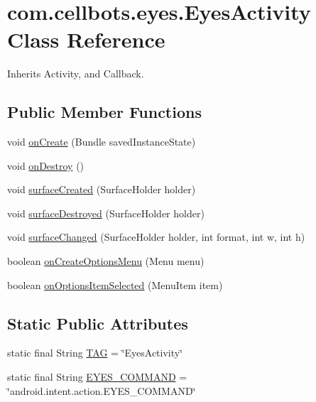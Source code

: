 \hypertarget{classcom_1_1cellbots_1_1eyes_1_1_eyes_activity}{\section{com.\-cellbots.\-eyes.\-Eyes\-Activity Class Reference}
\label{classcom_1_1cellbots_1_1eyes_1_1_eyes_activity}
}


Inherits Activity, and Callback.

\subsection*{Public Member Functions}
\begin{DoxyCompactItemize}
\item 
void \hyperlink{classcom_1_1cellbots_1_1eyes_1_1_eyes_activity_abce360dee7f83e0556a6587e0a20a404}{on\-Create} (Bundle saved\-Instance\-State)
\item 
void \hyperlink{classcom_1_1cellbots_1_1eyes_1_1_eyes_activity_a50ba777eb98f4c4970a77e87ab2e0569}{on\-Destroy} ()
\item 
void \hyperlink{classcom_1_1cellbots_1_1eyes_1_1_eyes_activity_acb9b8174f0c341cd8e186bbf986c5823}{surface\-Created} (Surface\-Holder holder)
\item 
void \hyperlink{classcom_1_1cellbots_1_1eyes_1_1_eyes_activity_a1b2463226def7e52e9e58cc01989a609}{surface\-Destroyed} (Surface\-Holder holder)
\item 
void \hyperlink{classcom_1_1cellbots_1_1eyes_1_1_eyes_activity_a4c7437b966b770d236aa101566e95616}{surface\-Changed} (Surface\-Holder holder, int format, int w, int h)
\item 
boolean \hyperlink{classcom_1_1cellbots_1_1eyes_1_1_eyes_activity_a42ad2a0e119de77ed2834bad1d9e746e}{on\-Create\-Options\-Menu} (Menu menu)
\item 
boolean \hyperlink{classcom_1_1cellbots_1_1eyes_1_1_eyes_activity_a8f50733dcdff98d0ab463a2488711eee}{on\-Options\-Item\-Selected} (Menu\-Item item)
\end{DoxyCompactItemize}
\subsection*{Static Public Attributes}
\begin{DoxyCompactItemize}
\item 
static final String \hyperlink{classcom_1_1cellbots_1_1eyes_1_1_eyes_activity_aa7c42c706a15ffa9dbe0dfa96c199e83}{T\-A\-G} = \char`\"{}Eyes\-Activity\char`\"{}
\item 
static final String \hyperlink{classcom_1_1cellbots_1_1eyes_1_1_eyes_activity_a1d6fc1d1f299d752777590a0a13c3f70}{E\-Y\-E\-S\-\_\-\-C\-O\-M\-M\-A\-N\-D} = \char`\"{}android.\-intent.\-action.\-E\-Y\-E\-S\-\_\-\-C\-O\-M\-M\-A\-N\-D\char`\"{}
\end{DoxyCompactItemize}


